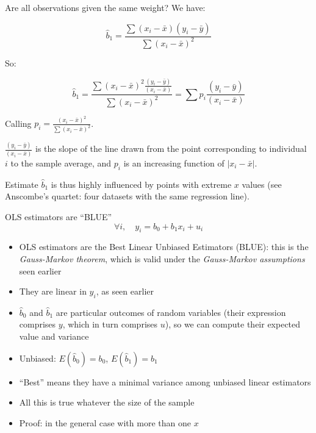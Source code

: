 \documentclass[aspectratio=169]{beamer}
\begin{document}
\begin{frame}{Are all observations given the same weight?}
We have:

\[\hat{b}_1 = \frac{\sum(x_i - \bar{x})(y_i - \bar{y})}{\sum(x_i - \bar{x})^2}\]

So:

\[\hat{b}_1 = \frac{\sum(x_i - \bar{x})^2 \frac{(y_i-\bar{y})}{(x_i-\bar{x})}}{\sum(x_i - \bar{x})^2} = \sum p_i\frac{(y_i - \bar{y})}{(x_i - \bar{x})}\]

Calling $p_i = \frac{(x_i - \bar{x})^2}{\sum(x_i - \bar{x})^2}$.

$\frac{(y_i-\bar{y})}{(x_i-\bar{x})}$ is the slope of the line drawn from the point corresponding to individual $i$ to the sample average, and $p_i$ is an increasing function of $|x_i - \bar{x}|$.

Estimate $\hat{b}_1$ is thus highly influenced by points with extreme $x$ values (see Anscombe's quartet: four datasets with the same regression line).
\end{frame}

\begin{frame}{OLS estimators are ``BLUE''}
\[\forall i, \quad y_i = b_0 + b_1x_i + u_i\]

\begin{itemize}
    \item OLS estimators are the Best Linear Unbiased Estimators (BLUE): this is the \textit{Gauss-Markov theorem}, which is valid under the \textit{Gauss-Markov assumptions} seen earlier
    \item They are linear in $y_i$, as seen earlier
    \item $\hat{b}_0$ and $\hat{b}_1$ are particular outcomes of random variables (their expression comprises $y$, which in turn comprises $u$), so we can compute their expected value and variance
    \item Unbiased: $E(\hat{b}_0) = b_0$, $E(\hat{b}_1) = b_1$
    \item ``Best'' means they have a minimal variance among unbiased linear estimators
    \item All this is true whatever the size of the sample
    \item Proof: in the general case with more than one $x$
\end{itemize}
\end{frame}
\end{document}
